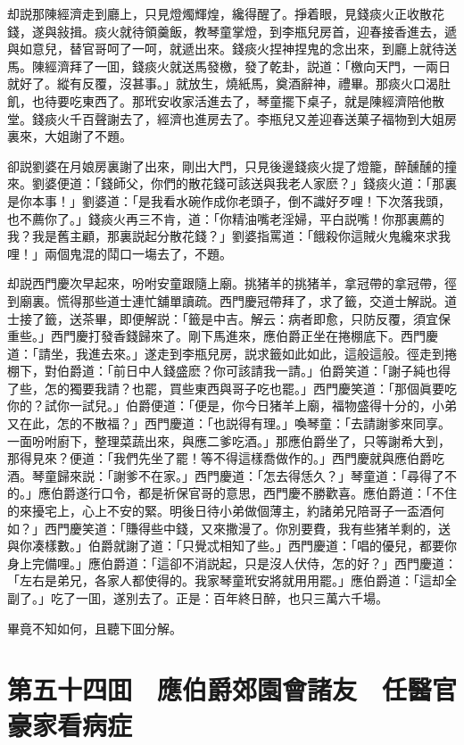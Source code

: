 却説那陳經濟走到廳上，只見燈燭輝煌，纔得醒了。掙着眼，見錢痰火正收散花錢，遂與敍揖。痰火就待領羹飯，教琴童掌燈，到李瓶兒房首，迎春接香進去，遞與如意兒，替官哥呵了一呵，就遞出來。錢痰火捏神捏鬼的念出來，到廳上就待送馬。陳經濟拜了一囬，錢痰火就送馬發檄，發了乾卦，説道：「檄向天門，一兩日就好了。縱有反覆，沒甚事。」就放生，燒紙馬，奠酒辭神，禮畢。那痰火口渴肚飢，也待要吃東西了。那玳安收家活進去了，琴童擺下桌子，就是陳經濟陪他散堂。錢痰火千百聲謝去了，經濟也進房去了。李瓶兒又差迎春送菓子福物到大姐房裏來，大姐謝了不題。

卻説劉婆在月娘房裏謝了出來，剛出大門，只見後邊錢痰火提了燈籠，醉醺醺的撞來。劉婆便道：「錢師父，你們的散花錢可該送與我老人家麽？」錢痰火道：「那裏是你本事！」劉婆道：「是我看水碗作成你老頭子，倒不識好歹哩！下次落我頭，也不薦你了。」錢痰火再三不肯，道：「你精油嘴老淫婦，平白説嘴！你那裏薦的我？我是舊主顧，那裏説起分散花錢？」劉婆指罵道：「餓殺你這賊火鬼纔來求我哩！」兩個鬼混的鬦口一塲去了，不題。

却説西門慶次早起來，吩咐安童跟隨上廟。挑猪羊的挑猪羊，拿冠帶的拿冠帶，徑到廟裏。慌得那些道士連忙舖單讀疏。西門慶冠帶拜了，求了籤，交道士解説。道士接了籤，送茶畢，即便解説：「籤是中吉。解云：病者即愈，只防反覆，須宜保重些。」西門慶打發香錢歸來了。剛下馬進來，應伯爵正坐在捲棚底下。西門慶道：「請坐，我進去來。」遂走到李瓶兒房，説求籤如此如此，這般這般。徑走到捲棚下，對伯爵道：「前日中人錢盛麽？你可該請我一請。」伯爵笑道：「謝子純也得了些，怎的獨要我請？也罷，買些東西與哥子吃也罷。」西門慶笑道：「那個眞要吃你的？試你一試兒。」伯爵便道：「便是，你今日猪羊上廟，福物盛得十分的，小弟又在此，怎的不散福？」西門慶道：「也説得有理。」喚琴童：「去請謝爹來同享。一面吩咐廚下，整理菜蔬出來，與應二爹吃酒。」那應伯爵坐了，只等謝希大到，那得見來？便道：「我們先坐了罷！等不得這樣喬做作的。」西門慶就與應伯爵吃酒。琴童歸來説：「謝爹不在家。」西門慶道：「怎去得恁久？」琴童道：「尋得了不的。」應伯爵遂行口令，都是祈保官哥的意思，西門慶不勝歡喜。應伯爵道：「不住的來擾宅上，心上不安的緊。明後日待小弟做個薄主，約諸弟兄陪哥子一盃酒何如？」西門慶笑道：「賺得些中錢，又來撒漫了。你別要費，我有些猪羊剩的，送與你凑樣數。」伯爵就謝了道：「只覺忒相知了些。」西門慶道：「唱的優兒，都要你身上完備哩。」應伯爵道：「這卻不消説起，只是沒人伏侍，怎的好？」西門慶道：「左右是弟兄，各家人都使得的。我家琴童玳安將就用用罷。」應伯爵道：「這却全副了。」吃了一囬，遂別去了。正是：百年終日醉，也只三萬六千場。

畢竟不知如何，且聽下囬分解。

\chapter*{第五十四囬　應伯爵郊園會諸友　任醫官豪家看病症}

